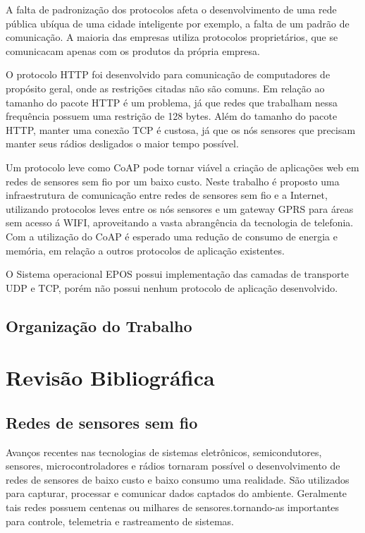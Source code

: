 A falta de padroniza\c{c}\~ao dos protocolos afeta o desenvolvimento de uma rede p\'ublica ub\'iqua de uma cidade inteligente por exemplo, a falta de um padr\~ao de comunica\c{c}\~ao. A maioria das empresas utiliza protocolos propriet\'arios, que se comunicacam apenas com os produtos da pr\'opria empresa.

O protocolo HTTP foi desenvolvido para comunica\c{c}\~ao de computadores de prop\'osito geral, onde as restri\c{c}\~oes citadas n\~ao s\~ao comuns. Em rela\c{c}\~ao ao tamanho do pacote HTTP \'e um problema, j\'a que redes que trabalham nessa frequ\^encia possuem uma restri\c{c}\~ao de 128 bytes.  Al\'em do tamanho do pacote HTTP, manter uma conex\~ao TCP \'e custosa, j\'a que os n\'os sensores que precisam manter seus r\'adios desligados o maior tempo poss\'ivel.

Um protocolo leve como CoAP pode tornar vi\'avel a cria\c{c}\~ao de aplica\c{c}\~oes web em redes de sensores sem fio por um baixo custo. Neste trabalho \'e proposto uma infraestrutura de comunica\c{c}\~ao entre redes de sensores sem fio e a Internet, utilizando protocolos leves entre os n\'os sensores e um gateway GPRS para \'areas sem acesso \'a WIFI, aproveitando a vasta abrang\^encia da tecnologia de telefonia. Com a utiliza\c{c}\~ao do CoAP \'e esperado uma redu\c{c}\~ao de consumo de energia e mem\'oria, em rela\c{c}\~ao a outros protocolos de aplica\c{c}\~ao existentes.

O Sistema operacional EPOS possui implementa\c{c}\~ao das camadas de transporte UDP e TCP, por\'em n\~ao possui nenhum protocolo de aplica\c{c}\~ao desenvolvido.

\subsection{Organiza\c{c}\~ao do Trabalho}

\section{Revis\~ao Bibliogr\'afica}

\subsection{Redes de sensores sem fio}
Avan\c{c}os recentes nas tecnologias de sistemas eletr\^onicos, semicondutores, sensores, microcontroladores e r\'adios tornaram poss\'ivel o desenvolvimento de redes de sensores de baixo custo e baixo consumo uma realidade. S\~ao utilizados para capturar, processar e comunicar dados captados do ambiente. Geralmente tais redes possuem centenas ou milhares de sensores.tornando-as importantes para controle, telemetria e rastreamento de sistemas.

